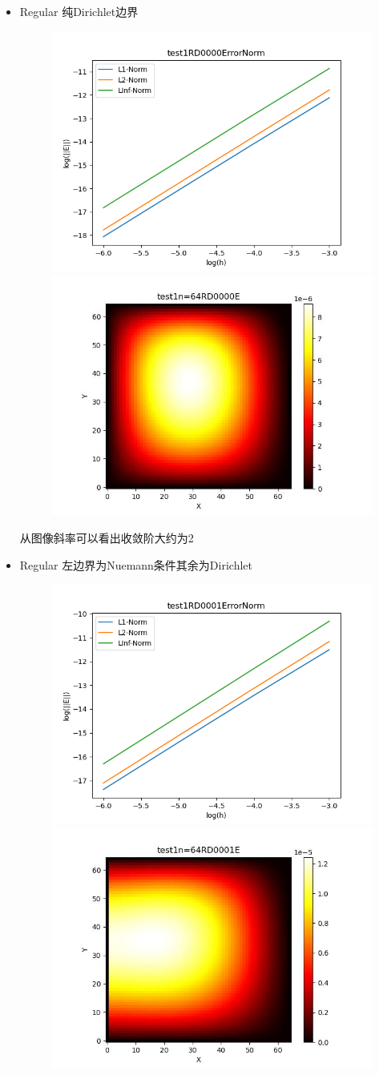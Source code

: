 \documentclass{article}
\begin{document}
\begin{itemize}
    \item Regular 纯Dirichlet边界
    \begin{figure}[h]
        \centering
        \includegraphics[width=0.35\linewidth]{test1RD0000ErrorNormjpg.png}
        \includegraphics[width=0.35\linewidth]{test1n=64RD0000E.jpg}
    \end{figure}

    从图像斜率可以看出收敛阶大约为2
    \item Regular 左边界为Nuemann条件其余为Dirichlet
    \begin{figure}[h]
        \centering
        \includegraphics[width=0.35\linewidth]{test1RD0001ErrorNormjpg.png}
        \includegraphics[width=0.35\linewidth]{test1n=64RD0001E.jpg}
    \end{figure}


\end{itemize}
\end{document}

